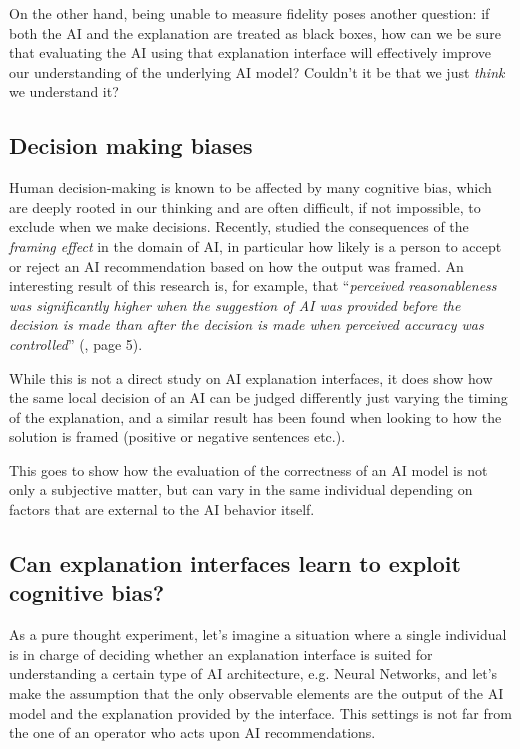 \documentclass[conference]{IEEEtran}
\begin{document}
On the other hand, being unable to measure fidelity poses another question: if
both the AI and the explanation are treated as black boxes, how can we be sure
that evaluating the AI using that explanation interface will effectively improve
our understanding of the underlying AI model? Couldn't it be that we just
\textit{think} we understand it?

\subsection{Decision making biases}
\label{sec:bias}

Human decision-making is known to be affected by many cognitive bias, which are
deeply rooted in our thinking and are often difficult, if not impossible, to
exclude when we make decisions. Recently, \citet{framingeffect} studied the
consequences of the \textit{framing effect} in the domain of AI, in particular
how likely is a person to accept or reject an AI recommendation based on how the
output was framed. An interesting result of this research is, for example, that
``\textit{perceived reasonableness was significantly higher when the suggestion
    of AI was provided before the decision is made than after the decision is made
    when perceived accuracy was controlled}'' (\citet{framingeffect}, page 5).

While this is not a direct study on AI explanation interfaces, it does show how
the same local decision of an AI can be judged differently just varying the
timing of the explanation, and a similar result has been found when looking to
how the solution is framed (positive or negative sentences etc.).

This goes to show how the evaluation of the correctness of an AI model is not
only a subjective matter, but can vary in the same individual depending on
factors that are external to the AI behavior itself.

\subsection{Can explanation interfaces learn to exploit cognitive bias?}
\label{sec:exploit}

As a pure thought experiment, let's imagine a situation where a single
individual is in charge of deciding whether an explanation interface is suited
for understanding a certain type of AI architecture, e.g. Neural Networks, and
let's make the assumption that the only observable elements are the output of
the AI model and the explanation provided by the interface. This settings is not
far from the one of an operator who acts upon AI recommendations.
\end{document}
